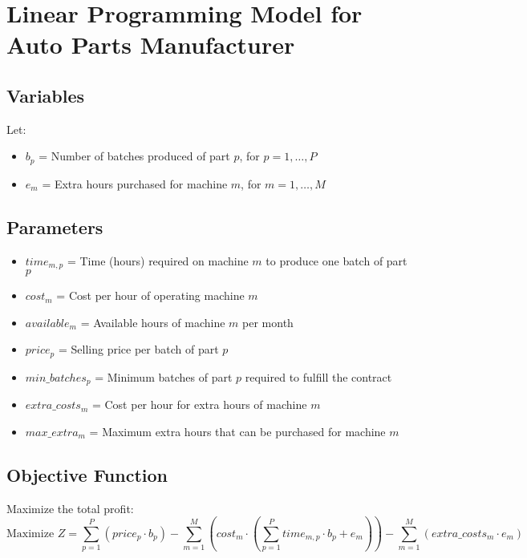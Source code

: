 \documentclass{article}
\begin{document}
\section*{Linear Programming Model for Auto Parts Manufacturer}

\subsection*{Variables}
Let:
\begin{itemize}
    \item \( b_p \) = Number of batches produced of part \( p \), for \( p = 1, \ldots, P \)
    \item \( e_m \) = Extra hours purchased for machine \( m \), for \( m = 1, \ldots, M \)
\end{itemize}

\subsection*{Parameters}
\begin{itemize}
    \item \( time_{m,p} \) = Time (hours) required on machine \( m \) to produce one batch of part \( p \)
    \item \( cost_m \) = Cost per hour of operating machine \( m \)
    \item \( available_m \) = Available hours of machine \( m \) per month
    \item \( price_p \) = Selling price per batch of part \( p \)
    \item \( min\_batches_p \) = Minimum batches of part \( p \) required to fulfill the contract
    \item \( extra\_costs_m \) = Cost per hour for extra hours of machine \( m \)
    \item \( max\_extra_m \) = Maximum extra hours that can be purchased for machine \( m \)
\end{itemize}

\subsection*{Objective Function}
Maximize the total profit:
\[
\text{Maximize } Z = \sum_{p=1}^{P} (price_p \cdot b_p) - \sum_{m=1}^{M} \left( cost_m \cdot \left( \sum_{p=1}^{P} time_{m,p} \cdot b_p + e_m \right) \right) - \sum_{m=1}^{M} (extra\_costs_m \cdot e_m)
\]
\end{document}
